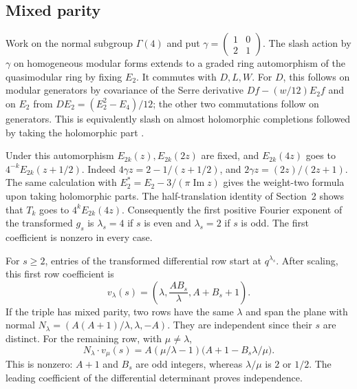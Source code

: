 \documentclass[11pt]{article}
\begin{document}
\clearpage
\subsection*{Mixed parity}
Work on the normal subgroup $\Gamma(4)$ and put $\gamma=\left(\begin{smallmatrix}1&0\\2&1\end{smallmatrix}\right)$. The slash action by $\gamma$ on homogeneous modular forms extends to a graded ring automorphism of the quasimodular ring by fixing $E_2$. It commutes with $D,L,W$. For $D$, this follows on modular generators by covariance of the Serre derivative $Df-(w/12)E_2 f$ and on $E_2$ from $DE_2=(E_2^2-E_4)/12$; the other two commutations follow on generators. This is equivalently slash on almost holomorphic completions followed by taking the holomorphic part \cite{NSZ}.

Under this automorphism $E_{2k}(z),E_{2k}(2z)$ are fixed, and $E_{2k}(4z)$ goes to $4^{-k}E_{2k}(z+1/2)$. Indeed $4\gamma z=2-1/(z+1/2)$, and $2\gamma z=(2z)/(2z+1)$. The same calculation with $E_2^*=E_2-3/(\pi\operatorname{Im}z)$ gives the weight-two formula upon taking holomorphic parts. The half-translation identity of Section~2 shows that $T_k$ goes to $4^k E_{2k}(4z)$. Consequently the first positive Fourier exponent of the transformed $g_s$ is $\lambda_s=4$ if $s$ is even and $\lambda_s=2$ if $s$ is odd. The first coefficient is nonzero in every case.

For $s\ge2$, entries of the transformed differential row start at $q^{\lambda_s}$. After scaling, this first row coefficient is
\[
 v_\lambda(s)=\left(\lambda,\frac{A B_s}{\lambda},A+B_s+1\right).
\]
If the triple has mixed parity, two rows have the same $\lambda$ and span the plane with normal $N_\lambda=(A(A+1)/\lambda,\lambda,-A)$. They are independent since their $s$ are distinct. For the remaining row, with $\mu\ne\lambda$,
\[
 N_\lambda\cdot v_\mu(s)=A(\mu/\lambda-1)\bigl(A+1-B_s\lambda/\mu\bigr).
\]
This is nonzero: $A+1$ and $B_s$ are odd integers, whereas $\lambda/\mu$ is $2$ or $1/2$. The leading coefficient of the differential determinant proves independence.
\end{document}
